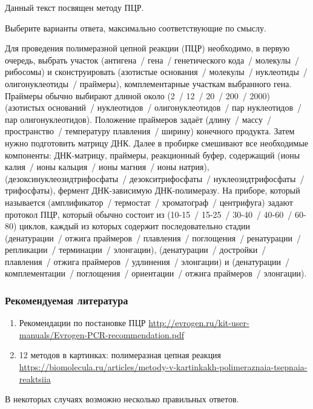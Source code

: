 
Данный текст посвящен методу ПЦР.

Выберите варианты ответа, максимально соответствующие по смыслу.

Для проведения полимеразной цепной реакции (ПЦР) необходимо, в первую очередь, выбрать участок 
(антигена~/ гена~/ генетического кода~/ молекулы~/ рибосомы) и сконструировать 
(азотистые основания~/ молекулы~/ нуклеотиды~/ олигонуклеотиды~/ праймеры), комплементарные участкам выбранного гена. Праймеры обычно выбирают длиной около 
(2~/ 12~/ 20~/ 200~/ 2000) (азотистых оснований~/ нуклеотидов~/ олигонуклеотидов~/ пар нуклеотидов~/ пар олигонуклеотидов). Положение праймеров задаёт 
(длину~/ массу~/ пространство~/ температуру плавления~/ ширину) конечного продукта. Затем нужно подготовить матрицу ДНК. Далее в пробирке смешивают все необходимые компоненты: ДНК-матрицу, праймеры, реакционный буфер, содержащий 
(ионы калия~/ ионы кальция~/ ионы магния~/ ионы натрия), (дезоксинуклеозидтрифосфаты~/ дезокситрифосфаты~/ нуклеозидтрифосфаты~/ трифосфаты), фермент ДНК-зависимую ДНК-полимеразу. На приборе, который называется 
(амплификатор~/ термостат~/ хроматограф~/ центрифуга) задают протокол ПЦР, который обычно состоит из 
(10-15~/ 15-25~/ 30-40~/ 40-60~/ 60-80)  циклов, каждый из которых содержит последовательно стадии 
(денатурации~/ отжига праймеров~/ плавления~/ поглощения~/ ренатурации~/ репликации~/ терминации~/ элонгации), 
(денатурации~/ достройки~/ плавления~/ отжига праймеров~/ удлинения~/ элонгации) и 
(денатурации~/ комплементации~/ поглощения~/ ориентации~/ отжига праймеров~/ элонгации).
\subsubsection*{Рекомендуемая литература}

\begin{enumerate}
    \item Рекомендации по постановке ПЦР \url{http://evrogen.ru/kit-user-manuals/Evrogen-PCR-recommendation.pdf}
    \item 12 методов в картинках: полимеразная цепная реакция \url{https://biomolecula.ru/articles/metody-v-kartinkakh-polimeraznaia-tsepnaia-reaktsiia}
\end{enumerate}

\explanationSection

В некоторых случаях возможно несколько правильных ответов.

